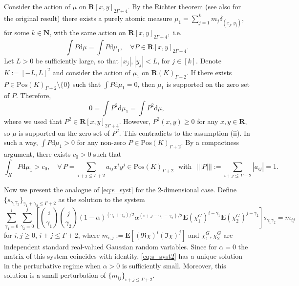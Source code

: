 \documentclass[10pt]{amsart}
\numberwithin{equation}{section}
\newcommand{\dif}{\mathrm{d}}
\newcommand{\E}{\mathbf{E}}
\newcommand{\R}{\mathbf{R}}
\newcommand{\N}{\mathbf{N}}
\begin{document}
Consider the action of $\mu$ on $\R[x,y]_{2\Gamma+4}$. By the Richter theorem \cite[Theorem~8.1]{moment_problem}   (see also \cite[Satz~4]{Richter57} for the original result) 
there exists a purely atomic measure $\mu_1=\sum_{j=1}^k m_j\delta_{(x_j,y_j)}$, for some $k\in\N$, with the same action on $\R[x,y]_{2\Gamma+4}$,~i.e.
\begin{equation*}
\int P\dif \mu = \int P \dif\mu_1,\quad \forall P\in \R[x,y]_{2\Gamma+4}.
\end{equation*}
Let $L>0$ be sufficiently large, so that $|x_j|,|y_j|< L$, for $j\in [k]$. Denote $K:=[-L,L]^2$ and consider the action of $\mu_1$ on $\R(K)_{\Gamma+2}$. If there exists $P\in \mathrm{Pos}(K)_{\Gamma+2}\setminus \{0\}$ such that $\int P\dif \mu_1=0$, then $\mu_1$ is supported on the zero set of $P$. Therefore,
\begin{equation*}
0=\int P^2 \dif\mu_1 = \int P^2 \dif \mu,
\end{equation*}
where we used that $P^2\in \R[x,y]_{2\Gamma+4}$. However, $P^2(x,y)\ge 0$ for any $x,y\in\R$, so $\mu$ is supported on the zero set of $P^2$. This contradicts to the assumption (ii). In such a way, $\int P\dif \mu_1>0$ for any non-zero $P\in \mathrm{Pos}(K)_{\Gamma+2}$. By a compactness argument, there exists $c_0>0$ such that
\begin{equation*}
\int_K P\dif \mu_1 > c_0,\quad \forall\, P=\sum_{i+j\le \Gamma+2} a_{ij}x^iy^j \in\mathrm{Pos}(K)_{\Gamma+2}\,\,\,\,\text{with}\,\,\,\, |||P|||:=\!\!\!\sum_{i+j\le \Gamma+2} |a_{ij}| =1.
\end{equation*}

Now we present the analogue of \eqref{eq:s_syst} for the 2-dimensional case. Define $\{s_{\gamma_1\gamma_2}\}_{\gamma_1+\gamma_2\le \Gamma+2}$ as the solution to the system 
\begin{equation}
\sum_{\gamma_1=0}^i \sum_{\gamma_2=0}^j \left[\binom{i}{\gamma_1}\binom{j}{\gamma_2} (1-\alpha)^{(\gamma_1+\gamma_2)/2}\alpha^{(i+j-\gamma_1-\gamma_2)/2}\E (\chi^G_1)^{i-\gamma_1}\E (\chi^G_2)^{j-\gamma_2}\right] s_{\gamma_1\gamma_2} = m_{ij}
\label{eq:s_syst2}
\end{equation}
for $i,j\ge 0$, $i+j\le \Gamma+2$, where $m_{i,j}:=\E \left[ (\Re\chi)^i (\Im\chi)^j\right]$ and $\chi_1^G, \chi_2^G$ are independent standard real-valued Gaussian random variables. Since for $\alpha=0$ the matrix of this system coincides with identity, \eqref{eq:s_syst2} has a unique solution in the perturbative regime when $\alpha>0$ is sufficiently small. Moreover, this solution is a small perturbation of $\{m_{ij}\}_{i+j\le \Gamma+2}$. 
\end{document}
